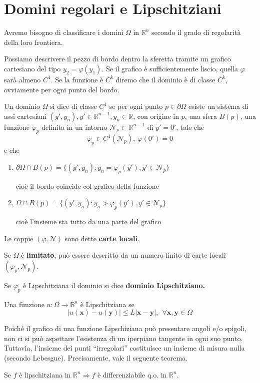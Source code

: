 \documentclass[10pt,a4paper,twoside,openright]{book}
\newcommand{\x}{\mathbf{x}}
\newcommand{\y}{\mathbf{y}}
\begin{document}
\section{Domini regolari e Lipschitziani}

Avremo bisogno di classificare i domini $\Omega $ in $\mathbb{R}^{n}$ secondo il grado di regolarità della loro frontiera.

Possiamo descrivere il pezzo di bordo dentro la sferetta tramite un grafico cartesiano del tipo $y_{2} =\varphi (y_{1})$. Se il grafico è sufficientemente liscio, quella $\varphi $ sarà almeno $C^{1}$. Se la funzione è $C^{k}$ diremo che il dominio è di classe $C^{k}$, ovviamente per ogni punto del bordo.


\begin{definition}
	Un dominio $\Omega $ si dice di classe $C^{1}$ se per ogni punto $p\in \partial \Omega $ esiste un sistema di assi cartesiani $(y',y_{n}),y'\in \mathbb{R}^{n-1},y_{n} \in \mathbb{R}$, con origine in $p$, una sfera $B(p)$, una funzione $\varphi _{p}$ definita in un intorno $\mathcal{N}_{p} \subset \mathbb{R}^{n-1}$ di $y'=0'$, tale che
	\begin{equation*}
	\varphi _{p} \in C^{1}(\mathcal{N}_{p}),\ \varphi (0') =0
	\end{equation*}
	e che
	\begin{enumerate}
	\item $\partial \Omega \cap B(p) =\{(y',y_{n}) :y_{n} =\varphi _{p}(y'),y'\in \mathcal{N}_{p}\}$

	cioè il bordo coincide col grafico della funzione
	\item $\Omega \cap B(p) =\{(y',y_{n}) :y_{n}  >\varphi _{p}(y'),y'\in \mathcal{N}_{p}\}$

	cioè l'insieme sta tutto da una parte del grafico
	\end{enumerate}
\end{definition}

Le coppie $(\varphi,\mathcal{N})$ sono dette \textbf{carte locali}.

Se $\Omega $ è \textbf{limitato}, può essere descritto da un numero finito di carte locali $(\varphi _{p},\mathcal{N}_{p})$.

Se $\varphi _{p}$ è Lipschitziana il dominio si dice \textbf{dominio Lipschitziano.}
\begin{definition}
 Una funzione $u:\Omega \rightarrow \mathbb{R}^{n}$ è Lipschitziana se
\begin{equation*}
| u(\x) -u(\y)| \leqslant L|\x-\y|,\ \ \forall \x,\y\in \Omega 
\end{equation*}
\end{definition}
Poiché il grafico di una funzione Lipschiziana può presentare angoli e/o spigoli, non ci si può aspettare l’esistenza di un iperpiano tangente in ogni suo punto. Tuttavia, l’insieme dei punti ``irregolari'' costituisce un insieme di misura nulla (secondo Lebesgue). Precisamente, vale il seguente teorema.
\begin{theorem}
[di Rademacher] Se $f$ è lipschitziana in $\mathbb{R}^{n} \Rightarrow f$ è differenziabile q.o. in $\mathbb{R}^{n}$.
\end{theorem}
\end{document}
